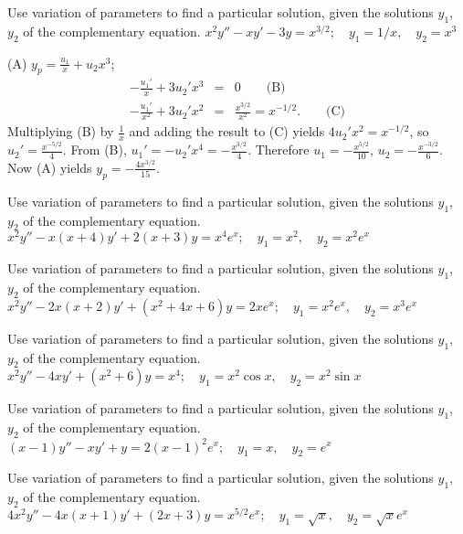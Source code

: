 \documentclass{ximera}
\begin{document}
\begin{problem}\label{exer:5.7.24}
Use variation
of parameters to find a particular solution, given the solutions
$y_1$, $y_2$ of the complementary equation. $x^2y''-xy'-3y=x^{3/2};  \quad y_1=1/x, \quad y_2=x^3$

\begin{solution}
(A) $y_p=\frac{u_1}{x}+u_2x^3$;\;
\begin{eqnarray*}
-\frac{u_1'}{x}+3u_2'x^3&=&0\qquad\text{(B)}\\ %
-\frac{u_1'}{x^2}+3u_2'x^2&=&\frac{x^{3/2}}{x^2}=x^{-1/2}. \qquad\text{(C)}%
\end{eqnarray*}
Multiplying (B) by $\frac{1}{x}$ and
adding the result to (C) yields
$4u_2'x^2=x^{-1/2}$, so $u_2'=\frac{x^{-5/2}}{4}$. From
(B), $u_1'=-u_2'x^4=-\frac{x^{3/2}}{4}$.
Therefore $u_1=-\frac{x^{5/2}}{10}$, $u_2=-\frac{x^{-3/2}}{6}$.
Now (A) yields $y_p=-\frac{4x^{3/2}}{15}$.
\end{solution}
\end{problem}

\begin{problem}\label{exer:5.7.25}
Use variation
of parameters to find a particular solution, given the solutions
$y_1$, $y_2$ of the complementary equation. $x^2y''-x(x+4)y'+2(x+3)y=x^4e^x;  \quad y_1=x^2, \quad y_2=x^2e^x$
\end{problem}

\begin{problem}\label{exer:5.7.26}
Use variation
of parameters to find a particular solution, given the solutions
$y_1$, $y_2$ of the complementary equation. $x^2y''-2x(x+2)y'+(x^2+4x+6)y=2xe^x;  \quad y_1=x^2e^x, \quad y_2=x^3e^x$
\end{problem}

\begin{problem}\label{exer:5.7.27}
Use variation
of parameters to find a particular solution, given the solutions
$y_1$, $y_2$ of the complementary equation. $x^2y''-4xy'+(x^2+6)y=x^4;  \quad y_1=x^2\cos x, \quad y_2=x^2\sin x$
\end{problem}

\begin{problem}\label{exer:5.7.28}
Use variation
of parameters to find a particular solution, given the solutions
$y_1$, $y_2$ of the complementary equation. $(x-1)y''-xy'+y=2(x-1)^2e^x;  \quad y_1=x, \quad y_2=e^x$
\end{problem}

\begin{problem}\label{exer:5.7.29}
Use variation
of parameters to find a particular solution, given the solutions
$y_1$, $y_2$ of the complementary equation. $4x^2y''-4x(x+1)y'+(2x+3)y=x^{5/2}e^x;   \quad
y_1=\sqrt x, \quad y_2=\sqrt xe^x$
\end{problem}
\end{document}
